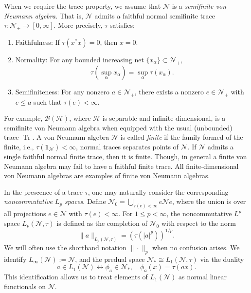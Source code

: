 \documentclass[11pt,reqno]{amsart}
\numberwithin{equation}{section}
\newcommand{\mc}{\mathcal}
\begin{document}
When we require the trace property, we assume that $\mathcal{N}$ is a \textit{semifinite von Neumann algebra}. That is, $\mathcal{N}$ admits a faithful normal semifinite trace $\tau : \mathcal{N}_{+} \to [0, \infty]$. More precisely, $\tau$ satisfies:
\begin{enumerate}
    \item[(i)] Faithfulness: If $\tau(x^* x) = 0$, then $x = 0$.
    \item[(ii)] Normality: For any bounded increasing net $\{ x_\alpha \} \subset \mathcal{N}_{+}$,
    $$
    \tau\left( \sup_\alpha x_\alpha \right) = \sup_\alpha \tau(x_\alpha).
    $$
    \item[(iii)] Semifiniteness: For any nonzero $a \in \mathcal{N}_{+}$, there exists a nonzero $e \in \mathcal{N}_+$ with $e \leq a$ such that $\tau(e) < \infty$.
\end{enumerate}

For example, $\mathcal{B}(\mathcal{H})$, where $\mathcal{H}$ is separable and infinite-dimensional, is a semifinite von Neumann algebra when equipped with the usual (unbounded) trace $\operatorname{Tr}$. A von Neumann algebra $\mathcal{N}$ is called \textit{finite} if the family formed of the finite, i.e., $\tau(\textbf{1}_{\mathcal N}) < \infty$, normal traces separates points of $\mathcal N$. If $\mathcal N$ admits a single faithful normal finite trace, then it is finite. Though, in general a finite von Neumann algebra may fail to have a faithful finite trace. All finite-dimensional von Neumann algebras are examples of finite von Neumann algebras.

In the prescence of a trace $\tau$, one may naturally consider the corresponding \emph{noncommutative $L_p$ spaces}. Define $\mathcal{N}_0 = \bigcup_{\tau(e) < \infty} e \mathcal{N} e$, where the union is over all projections $e \in \mathcal{N}$ with $\tau(e) < \infty$. For $1 \leq p < \infty$, the noncommutative \( L^p \) space \( L_p(\mathcal{N}, \tau) \) is defined as the completion of \( \mathcal{N}_0 \) with respect to the norm
$$
\| a \|_{L_p(\mathcal{N}, \tau)} = \left( \tau( |a|^p ) \right)^{1/p}.
$$
We will often use the shorthand notation \( \| \cdot \|_p \) when no confusion arises. We identify \( L_\infty(\mathcal{N}) := \mathcal{N} \), and the predual space \( \mathcal{N}_* \cong L_1(\mathcal{N}, \tau) \) via the duality
\begin{equation}\label{eqn:tracial state}
    a\in L_1(\mc N) \longleftrightarrow \phi_a\in \mc N_*,\quad \phi_a(x)=\tau(ax).
\end{equation}
This identification allows us to treat elements of \( L_1(\mathcal{N}) \) as normal linear functionals on \( \mathcal{N} \).
\end{document}
